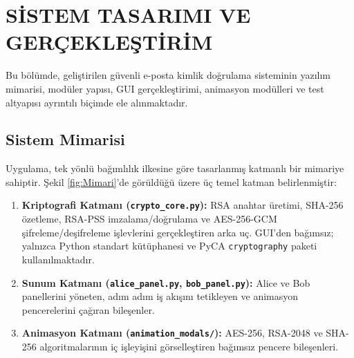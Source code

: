 \chapter{SİSTEM TASARIMI VE GERÇEKLEŞTİRİM}
\label{IkinciBolum}

Bu bölümde, geliştirilen güvenli e-posta kimlik doğrulama sisteminin yazılım mimarisi, modüler yapısı, GUI gerçekleştirimi, animasyon modülleri ve test altyapısı ayrıntılı biçimde ele alınmaktadır.

\section{Sistem Mimarisi}

Uygulama, tek yönlü bağımlılık ilkesine göre tasarlanmış katmanlı bir mimariye sahiptir. Şekil \ref{fig:Mimari}'de görüldüğü üzere üç temel katman belirlenmiştir:

\begin{enumerate}
    \item \textbf{Kriptografi Katmanı (\texttt{crypto\_core.py}):} RSA anahtar üretimi, SHA-256 özetleme, RSA-PSS imzalama/doğrulama ve AES-256-GCM şifreleme/deşifreleme işlevlerini gerçekleştiren arka uç. GUI'den bağımsız; yalnızca Python standart kütüphanesi ve PyCA \texttt{cryptography} paketi kullanılmaktadır.
    \item \textbf{Sunum Katmanı (\texttt{alice\_panel.py}, \texttt{bob\_panel.py}):} Alice ve Bob panellerini yöneten, adım adım iş akışını tetikleyen ve animasyon pencerelerini çağıran bileşenler.
    \item \textbf{Animasyon Katmanı (\texttt{animation\_modals/}):} AES-256, RSA-2048 ve SHA-256 algoritmalarının iç işleyişini görselleştiren bağımsız pencere bileşenleri.
\end{enumerate}

